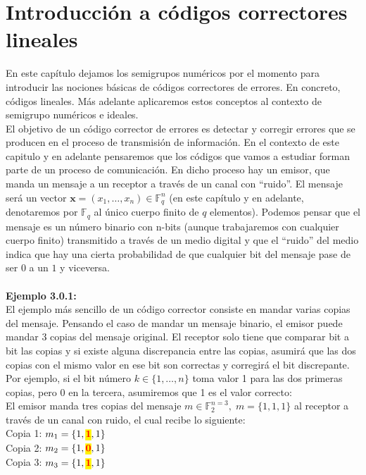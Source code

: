 \documentclass[11pt,spanish]{book}
\begin{document}
\chapter{Introducción a códigos correctores lineales}
En este capítulo dejamos los semigrupos numéricos por el momento para introducir las nociones básicas de códigos correctores de errores. En concreto, códigos lineales. Más adelante aplicaremos estos conceptos al contexto de semigrupo numéricos e ideales.\\

El objetivo de un código corrector de errores es detectar y corregir errores que se producen en el proceso de transmisión de información. En el contexto de este capitulo y en adelante pensaremos que los códigos que vamos a estudiar forman parte de un proceso de comunicación. En dicho proceso hay un emisor, que manda un mensaje a un receptor a través de un canal con ``ruido''. El mensaje será un vector $\mathbf{x}=(x_{1},\ldots,x_{n})\in \mathbb{F}_{q}^{n}$ (en este capítulo y en adelante, denotaremos por $\mathbb{F}_{q}$ al único cuerpo finito de $q$ elementos). Podemos pensar que el mensaje es un número binario con n-bits (aunque trabajaremos con cualquier cuerpo finito) transmitido a través de un medio digital y que el ``ruido'' del medio indica que hay una cierta probabilidad de que cualquier bit del mensaje pase de ser $0$ a un $1$ y viceversa.\\
\\ \textbf{Ejemplo 3.0.1:}\\

El ejemplo más sencillo de un código corrector consiste en mandar varias copias del mensaje. Pensando el caso de mandar un mensaje binario, el emisor puede mandar 3 copias del mensaje original. El receptor solo tiene que comparar bit a bit las copias y si existe alguna discrepancia entre las copias, asumirá que las dos copias con el mismo valor en ese bit son correctas y corregirá el bit discrepante. Por ejemplo, si el bit número $k\in\{1,\ldots ,n\}$ toma valor 1 para las dos primeras copias, pero 0 en la tercera, asumiremos que 1 es el valor correcto:\\
El emisor manda tres copias del mensaje $m\in\mathbb{F}_{2}^{n=3},\; m=\{1,1,1\}$ al receptor a través de un canal con ruido, el cual recibe lo siguiente:\\
Copia 1: $ m_{1}=\{1,\textcolor{red}{\textbf{\hl{1}}},1\}$\\
Copia 2: $ m_{2}=\{1,\textcolor{red}{\textbf{\hl{0}}},1\}$\\
Copia 3: $ m_{3}=\{1,\textcolor{red}{\textbf{\hl{1}}},1\}$\\
\end{document}
